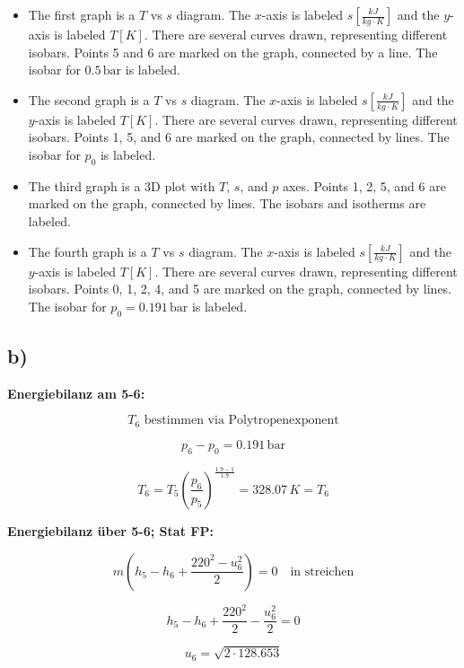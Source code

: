 \begin{itemize}
    \item The first graph is a $T$ vs $s$ diagram. The $x$-axis is labeled $s \left[\frac{kJ}{kg \cdot K}\right]$ and the $y$-axis is labeled $T \left[K\right]$. There are several curves drawn, representing different isobars. Points 5 and 6 are marked on the graph, connected by a line. The isobar for $0.5 \, \text{bar}$ is labeled.
    
    \item The second graph is a $T$ vs $s$ diagram. The $x$-axis is labeled $s \left[\frac{kJ}{kg \cdot K}\right]$ and the $y$-axis is labeled $T \left[K\right]$. There are several curves drawn, representing different isobars. Points 1, 5, and 6 are marked on the graph, connected by lines. The isobar for $p_0$ is labeled.
    
    \item The third graph is a 3D plot with $T$, $s$, and $p$ axes. Points 1, 2, 5, and 6 are marked on the graph, connected by lines. The isobars and isotherms are labeled.
    
    \item The fourth graph is a $T$ vs $s$ diagram. The $x$-axis is labeled $s \left[\frac{kJ}{kg \cdot K}\right]$ and the $y$-axis is labeled $T \left[K\right]$. There are several curves drawn, representing different isobars. Points 0, 1, 2, 4, and 5 are marked on the graph, connected by lines. The isobar for $p_0 = 0.191 \, \text{bar}$ is labeled.
\end{itemize}

\subsection*{b)}

\textbf{Energiebilanz am 5-6:}

\[ T_6 \text{ bestimmen via Polytropenexponent} \]

\[ p_6 - p_0 = 0.191 \, \text{bar} \]

\[ T_6 = T_5 \left(\frac{p_6}{p_5}\right)^{\frac{1.9-1}{1.9}} = 328.07 \, K = T_6 \]

\textbf{Energiebilanz über 5-6; Stat FP:}

\[ m \left( h_5 - h_6 + \frac{220^2 - u_6^2}{2} \right) = 0 \quad \text{in streichen} \]

\[ h_5 - h_6 + \frac{220^2}{2} - \frac{u_6^2}{2} = 0 \]

\[ u_6 = \sqrt{2 \cdot 128.653} \]

